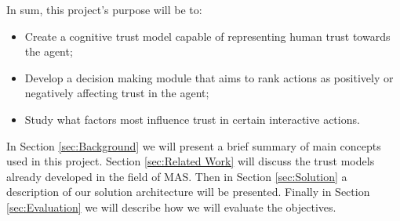 In sum, this project's purpose will be to:
\begin{itemize}
	\item Create a cognitive trust model capable of representing human trust towards the agent;
	\item Develop a decision making module that aims to rank actions as positively or negatively affecting trust in the agent;
	\item Study what factors most influence trust in certain interactive actions.
\end{itemize}


In Section \ref{sec:Background} we will present a brief summary of main concepts used in this project. Section \ref{sec:Related Work} will discuss the trust models already developed in the field of \ac{MAS}. Then in Section \ref{sec:Solution} a description of our solution architecture will be presented. Finally in Section \ref{sec:Evaluation} we will describe how we will evaluate the objectives.


